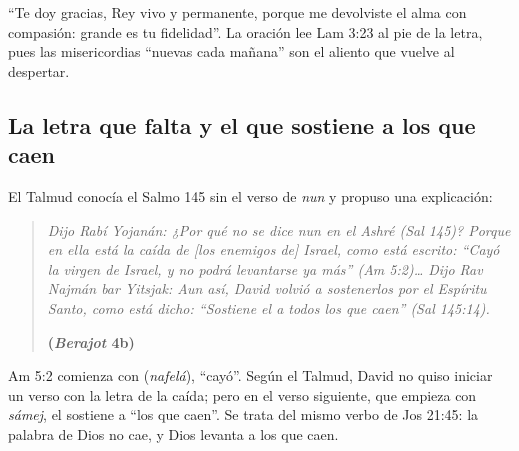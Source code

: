 
``Te doy gracias, Rey vivo y permanente, porque me devolviste el alma con compasión: grande es tu fidelidad''. La oración lee Lam 3:23 al pie de la letra, pues las misericordias ``nuevas cada mañana'' son el aliento que vuelve al despertar.


\subsection{La letra que falta y el que sostiene a los que caen}
El Talmud conocía el Salmo 145 sin el verso de \emph{nun} y propuso una explicación:

\begin{quote}\itshape
Dijo Rabí Yojanán: ¿Por qué no se dice \emph{nun} en el \emph{Ashré} (Sal 145)? Porque en ella está la caída de [los enemigos de] Israel, como está escrito: ``Cayó la virgen de Israel, y no podrá levantarse ya más'' (Am 5:2)\ldots{} Dijo Rav Najmán bar Yitsjak: Aun así, David volvió a sostenerlos por el Espíritu Santo, como está dicho: ``Sostiene el \SENOR{} a todos los que caen'' (Sal 145:14).\par\hfill{\upshape\small\bfseries\textcolor{azul}{(\emph{Berajot} 4b)}}
\end{quote}


Am 5:2 comienza con  (\emph{nafelá}), ``cayó''. Según el Talmud, David no quiso iniciar un verso con la letra de la caída; pero en el verso siguiente, que empieza con \emph{sámej}, el \SENOR{} sostiene a ``los que caen''. Se trata del mismo verbo de Jos 21:45: la palabra de Dios no cae, y Dios levanta a los que caen.


